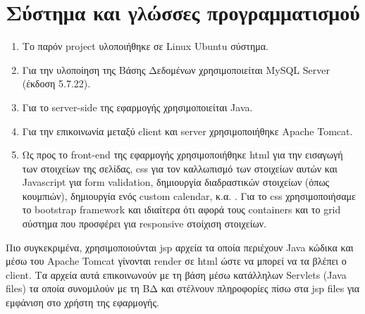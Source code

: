 \documentclass[a4paper,oneside, 11pt]{article}
\begin{document}
\section{Σύστημα και γλώσσες προγραμματισμού}
\begin{enumerate}
\item Το παρόν project υλοποιήθηκε σε Linux Ubuntu σύστημα. 
\item Για την υλοποίηση της Βάσης Δεδομένων χρησιμοποιείται MySQL Server (έκδοση 5.7.22). \bigbreak 
\item Για το server-side της εφαρμογής χρησιμοποιείται Java.  
\item Για την επικοινωνία μεταξύ client και server χρησιμοποιήθηκε Apache Tomcat.
\item Ως προς το front-end της εφαρμογής χρησιμοποιήθηκε html για την εισαγωγή των στοιχείων της σελίδας, css για τον καλλωπισμό των στοιχείων αυτών και Javascript για form validation, δημιουργία διαδραστικών στοιχείων (όπως κουμπιών), δημιουργία ενός custom calendar, κ.α. . Για το css χρησιμοποιήσαμε το bootstrap framework και ιδιαίτερα ότι αφορά τους containers και το grid σύστημα που προσφέρει για responsive στοίχιση στοιχείων.
\end{enumerate}
Πιο συγκεκριμένα, χρησιμοποιούνται jsp αρχεία τα οποία περιέχουν Java κώδικα και μέσω του Apache Tomcat γίνονται render σε html ώστε να μπορεί να τα βλέπει ο client. Τα αρχεία αυτά επικοινωνούν με τη βάση μέσω κατάλληλων Servlets (Java files) τα οποία συνομιλούν με τη ΒΔ και στέλνουν πληροφορίες πίσω στα jsp files για εμφάνιση στο χρήστη της εφαρμογής.
\end{document}
